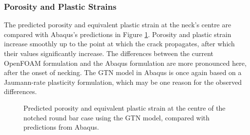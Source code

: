 \documentclass[sn-mathphys,Numbered]{sn-jnl}%
\begin{document}
\subsubsection{Porosity and Plastic Strains}
The predicted porosity and equivalent plastic strain at the neck's centre are compared with Abaqus's predictions in Figure \ref{fig:axi_GTN_pointResults}.
Porosity and plastic strain increase smoothly up to the point at which the crack propagates, after which their values significantly increase.
The differences between the current OpenFOAM formulation and the Abaqus formulation are more pronounced here, after the onset of necking.
The GTN model in Abaqus is once again based on a Jaumann-rate plasticity formulation, which may be one reason for the observed differences.
\begin{figure}[htb]
	\centering
		\caption{Predicted porosity and equivalent plastic strain at the centre of the notched round bar case using the GTN model, compared with predictions from Abaqus.}
	\label{fig:axi_GTN_pointResults}
\end{figure}
\end{document}
